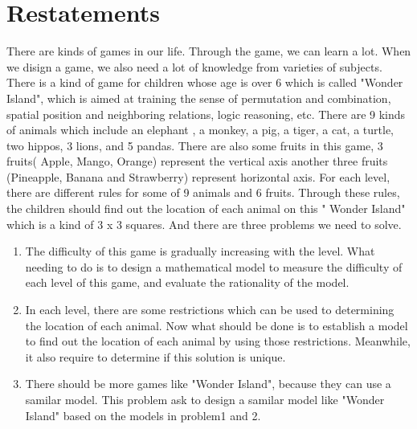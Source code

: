 \documentclass[12pt,a4paper,]{article}
\begin{document}
\newpage

\tableofcontents

\newpage
\renewcommand{\baselinestretch}{1.5}
\section{Restatements}
There are kinds of games in our life. Through the game, we can learn a lot. When we disign a game, we also need a lot of knowledge from varieties of subjects.  There is a kind of game for children whose age is over 6 which is called "Wonder Island", which is aimed at training the sense of permutation and combination, spatial position and neighboring relations, logic reasoning, etc.  There are 9 kinds of animals which include an elephant , a monkey, a pig, a tiger, a cat, a turtle, two hippos, 3 lions, and 5 pandas.  There are also some fruits in this game, 3 fruits( Apple, Mango, Orange)  represent the vertical axis another three fruits (Pineapple, Banana and Strawberry) represent horizontal axis. For each level, there are different rules for some of 9 animals and 6 fruits. Through these rules, the children should find out the location of each animal on this " Wonder Island"  which is a kind of 3 x 3 squares. And there are three problems we need to solve.

\begin{enumerate}[(1)]
\item The difficulty of this game is gradually increasing with the level. What needing to do is to design a mathematical model to measure the difficulty of each level of this game, and evaluate the rationality of the model.

\item In each level, there are some restrictions which can be used to determining the location of each animal. Now what should be done is to establish a model to find out the location of each animal by using those restrictions. Meanwhile, it also require to determine if this solution is unique.

\item There should be more games like "Wonder Island", because they can use a samilar model. This problem ask to design a samilar model like "Wonder Island" based on the models in problem1 and 2. 
\end{enumerate}
\end{document}
